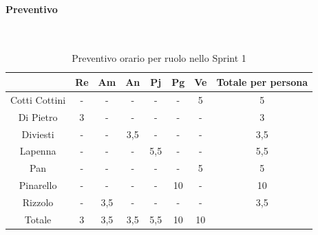 \documentclass{article}
\begin{document}
                \paragraph{Preventivo}\mbox{}\\
                \begin{table}[H]
                    \centering
                    \begin{tabular}{|c|c|c|c|c|c|c|c|}
                    \hline
                                  & Re  & Am  & An  & Pj  & Pg  & Ve  & Totale per persona \\ \hline
                    Cotti Cottini & -   & -   & -   & -   & -   & 5   & 5                  \\ \hline
                    Di Pietro     & 3   & -   & -   & -   & -   & -   & 3                  \\ \hline
                    Diviesti      & -   & -   & 3,5 & -   & -   & -   & 3,5                \\ \hline
                    Lapenna       & -   & -   & -   & 5,5 & -   & -   & 5,5                \\ \hline
                    Pan           & -   & -   & -   & -   & -   & 5   & 5                  \\ \hline
                    Pinarello     & -   & -   & -   & -   & 10  & -   & 10                 \\ \hline
                    Rizzolo       & -   & 3,5 & -   & -   & -   & -   & 3,5                \\ \hline
                    Totale        & 3   & 3,5 & 3,5 & 5,5 & 10  & 10  &                    \\ \hline
                    \end{tabular}
                    \caption{Preventivo orario per ruolo nello Sprint 1}
                \end{table}

\end{document}
